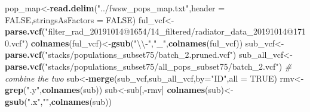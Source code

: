 \documentclass[]{article}
\newenvironment{Shaded}{\begin{snugshade}}{\end{snugshade}}
\newcommand{\KeywordTok}[1]{\textcolor[rgb]{0.13,0.29,0.53}{\textbf{#1}}}
\newcommand{\DataTypeTok}[1]{\textcolor[rgb]{0.13,0.29,0.53}{#1}}
\newcommand{\CharTok}[1]{\textcolor[rgb]{0.31,0.60,0.02}{#1}}
\newcommand{\StringTok}[1]{\textcolor[rgb]{0.31,0.60,0.02}{#1}}
\newcommand{\CommentTok}[1]{\textcolor[rgb]{0.56,0.35,0.01}{\textit{#1}}}
\newcommand{\OtherTok}[1]{\textcolor[rgb]{0.56,0.35,0.01}{#1}}
\newcommand{\OperatorTok}[1]{\textcolor[rgb]{0.81,0.36,0.00}{\textbf{#1}}}
\newcommand{\NormalTok}[1]{#1}
\begin{document}
\begin{Shaded}
\begin{Highlighting}[]
\NormalTok{pop_map<-}\KeywordTok{read.delim}\NormalTok{(}\StringTok{"../fwsw_pops_map.txt"}\NormalTok{,}\DataTypeTok{header =} \OtherTok{FALSE}\NormalTok{,}\DataTypeTok{stringsAsFactors =} \OtherTok{FALSE}\NormalTok{)}
\NormalTok{ful_vcf<-}\KeywordTok{parse.vcf}\NormalTok{(}\StringTok{"filter_rad_20191014@1654/14_filtered/radiator_data_20191014@1710.vcf"}\NormalTok{)}
\KeywordTok{colnames}\NormalTok{(ful_vcf)<-}\KeywordTok{gsub}\NormalTok{(}\StringTok{"}\CharTok{\textbackslash{}\textbackslash{}}\StringTok{-"}\NormalTok{,}\StringTok{"_"}\NormalTok{,}\KeywordTok{colnames}\NormalTok{(ful_vcf))}
\NormalTok{sub_vcf<-}\KeywordTok{parse.vcf}\NormalTok{(}\StringTok{"stacks/populations_subset75/batch_2.pruned.vcf"}\NormalTok{)}
\NormalTok{sub_all_vcf<-}\KeywordTok{parse.vcf}\NormalTok{(}\StringTok{"stacks/populations_subset75/all_pops_subset75/batch_2.vcf"}\NormalTok{)}
\CommentTok{# combine the two}
\NormalTok{sub<-}\KeywordTok{merge}\NormalTok{(sub_vcf,sub_all_vcf,}\DataTypeTok{by=}\StringTok{"ID"}\NormalTok{,}\DataTypeTok{all =} \OtherTok{TRUE}\NormalTok{)}
\NormalTok{rmv<-}\KeywordTok{grep}\NormalTok{(}\StringTok{".y"}\NormalTok{,}\KeywordTok{colnames}\NormalTok{(sub))}
\NormalTok{sub<-sub[,}\OperatorTok{-}\NormalTok{rmv]}
\KeywordTok{colnames}\NormalTok{(sub)<-}\KeywordTok{gsub}\NormalTok{(}\StringTok{".x"}\NormalTok{,}\StringTok{""}\NormalTok{,}\KeywordTok{colnames}\NormalTok{(sub))}
\end{Highlighting}
\end{Shaded}
\end{document}
